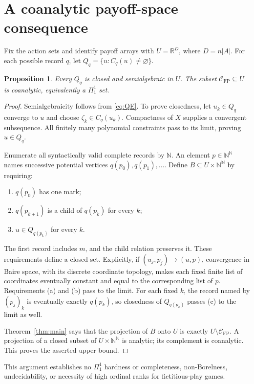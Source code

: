 \documentclass[11pt,a4paper]{article}
\newtheorem{proposition}[theorem]{Proposition}
\theoremstyle{definition}
\newcommand{\R}{\mathbb R}
\newcommand{\N}{\mathbb N}
\newcommand{\CFP}{\mathcal C_{\mathrm{FP}}}
\begin{document}
\section{A coanalytic payoff-space consequence}

Fix the action sets and identify payoff arrays with $U=\R^D$, where
$D=n|A|$. For each possible record $q$, let
$Q_q=\{u:C_q(u)\ne\varnothing\}$.

\begin{proposition}\label{prop:coanalytic}
Every $Q_q$ is closed and semialgebraic in $U$. The subset $\CFP\subseteq U$
is coanalytic, equivalently a $\Pi^1_1$ set.
\end{proposition}

\begin{proof}
Semialgebraicity follows from \eqref{eq:QE}. To prove closedness, let
$u_k\in Q_q$ converge to $u$ and choose $\zeta_k\in C_q(u_k)$.
Compactness of $X$ supplies a convergent subsequence. All finitely many
polynomial constraints pass to its limit, proving $u\in Q_q$.

Enumerate all syntactically valid complete records by $\N$.
An element $p\in\N^{\N}$ names successive potential vertices
$q(p_0),q(p_1),\ldots$. Define $B\subseteq U\times\N^{\N}$ by requiring:
\begin{enumerate}[label=\textup{(\alph*)}]
\item $q(p_0)$ has one mark;
\item $q(p_{k+1})$ is a child of $q(p_k)$ for every $k$;
\item $u\in Q_{q(p_k)}$ for every $k$.
\end{enumerate}
The first record includes $m$, and the child relation preserves it.
These requirements define a closed set. Explicitly, if
$(u_j,p_j)\to(u,p)$, convergence in Baire space, with its discrete
coordinate topology, makes each fixed finite list of coordinates
eventually constant and equal to the corresponding list of $p$.
Requirements (a) and (b) pass to the limit. For each fixed $k$, the
record named by $(p_j)_k$ is eventually exactly $q(p_k)$, so closedness
of $Q_{q(p_k)}$ passes (c) to the limit as well.

Theorem~\ref{thm:main} says that the projection of $B$ onto $U$ is exactly
$U\setminus\CFP$. A projection of a closed subset of
$U\times\N^{\N}$ is analytic; its complement is coanalytic. This proves
the asserted upper bound.
\end{proof}

This argument establishes no $\Pi^1_1$ hardness or completeness,
non-Borelness, undecidability, or necessity of high ordinal ranks for
fictitious-play games.
\end{document}
